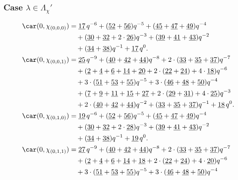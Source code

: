 \subsubsection{Case $\lambda\in \Lambda_\chi'$}

\begin{align*}
	\car(0,\chi_{(0,0,0)})
	&=\underline{17}\,q^{-6}+(\underline{52}+\underline{56})q^{-5}+(\underline{45}+\underline{47}+\underline{49})q^{-4}\\
	&\quad+(\underline{30}+\underline{32}+2\cdot\underline{26})q^{-3}+(\underline{39}+\underline{41}+\underline{43})q^{-2}\\
	&\quad+(\underline{34}+\underline{38})q^{-1}+\underline{17}\,q^0.\\
	\car(0,\chi_{(0,0,1)})
	&=\underline{25}\,q^{-9}+(\underline{40}+\underline{42}+\underline{44})q^{-8}+2\cdot(\underline{33}+\underline{35}+\underline{37})q^{-7}\\
	&\quad+(\underline{2}+\underline{4}+\underline{6}+\underline{14}+\underline{20}+2\cdot(\underline{22}+\underline{24})+4\cdot\underline{18})q^{-6}\\
	&\quad+3\cdot(\underline{51}+\underline{53}+\underline{55})q^{-5}+3\cdot(\underline{46}+\underline{48}+\underline{50})q^{-4}\\
	&\quad+(\underline{7}+\underline{9}+\underline{11}+\underline{15}+\underline{27}+2\cdot(\underline{29}+\underline{31})+4\cdot\underline{25})q^{-3}\\
	&\quad+2\cdot(\underline{40}+\underline{42}+\underline{44})q^{-2}+(\underline{33}+\underline{35}+\underline{37})q^{-1}+\underline{18}\,q^0.\\
	\car(0,\chi_{(0,1,0)})
	&=\underline{19}\,q^{-6}+(\underline{52}+\underline{56})q^{-5}+(\underline{45}+\underline{47}+\underline{49})q^{-4}\\
	&\quad+(\underline{30}+\underline{32}+2\cdot\underline{28})q^{-3}+(\underline{39}+\underline{41}+\underline{43})q^{-2}\\
	&\quad+(\underline{34}+\underline{38})q^{-1}+\underline{19}\,q^0.\\
	\car(0,\chi_{(0,1,1)})
	&=\underline{27}\,q^{-9}+(\underline{40}+\underline{42}+\underline{44})q^{-8}+2\cdot(\underline{33}+\underline{35}+\underline{37})q^{-7}\\
	&\quad+(\underline{2}+\underline{4}+\underline{6}+\underline{14}+\underline{18}+2\cdot(\underline{22}+\underline{24})+4\cdot\underline{20})q^{-6}\\
	&\quad+3\cdot(\underline{51}+\underline{53}+\underline{55})q^{-5}+3\cdot(\underline{46}+\underline{48}+\underline{50})q^{-4}\\

\end{align*}
